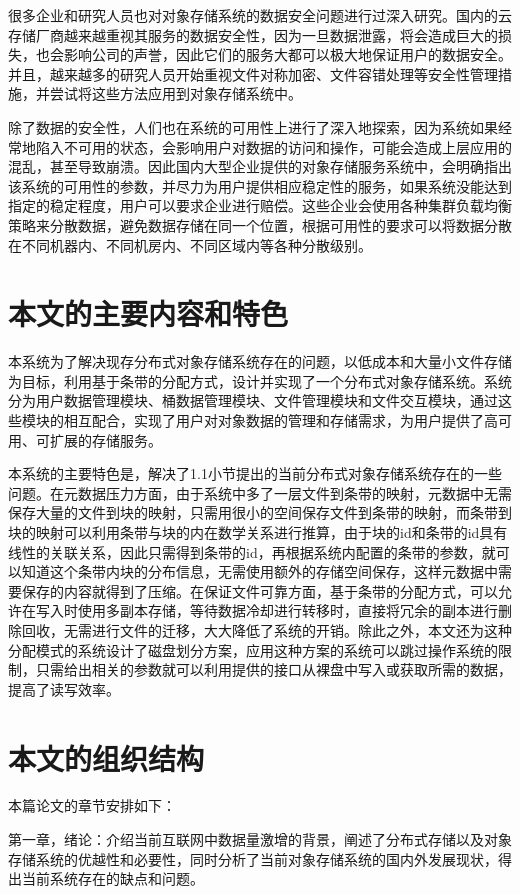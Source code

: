 很多企业和研究人员也对对象存储系统的数据安全问题进行过深入研究。国内的云存储厂商越来越重视其服务的数据安全性，因为一旦数据泄露，将会造成巨大的损失，也会影响公司的声誉，因此它们的服务大都可以极大地保证用户的数据安全。并且，越来越多的研究人员开始重视文件对称加密\cite{19}、文件容错处理等安全性管理措施，并尝试将这些方法应用到对象存储系统中。

除了数据的安全性，人们也在系统的可用性上进行了深入地探索，因为系统如果经常地陷入不可用的状态，会影响用户对数据的访问和操作，可能会造成上层应用的混乱，甚至导致崩溃。因此国内大型企业提供的对象存储服务系统中，会明确指出该系统的可用性的参数，并尽力为用户提供相应稳定性的服务，如果系统没能达到指定的稳定程度，用户可以要求企业进行赔偿。这些企业会使用各种集群负载均衡策略来分散数据，避免数据存储在同一个位置，根据可用性的要求可以将数据分散在不同机器内、不同机房内、不同区域内等各种分散级别。

\section{本文的主要内容和特色}%
本系统为了解决现存分布式对象存储系统存在的问题，以低成本和大量小文件存储为目标，利用基于条带的分配方式，设计并实现了一个分布式对象存储系统。系统分为用户数据管理模块、桶数据管理模块、文件管理模块和文件交互模块，通过这些模块的相互配合，实现了用户对对象数据的管理和存储需求，为用户提供了高可用、可扩展的存储服务。

本系统的主要特色是，解决了1.1小节提出的当前分布式对象存储系统存在的一些问题。在元数据压力方面，由于系统中多了一层文件到条带的映射，元数据中无需保存大量的文件到块的映射，只需用很小的空间保存文件到条带的映射，而条带到块的映射可以利用条带与块的内在数学关系进行推算，由于块的id和条带的id具有线性的关联关系，因此只需得到条带的id，再根据系统内配置的条带的参数，就可以知道这个条带内块的分布信息，无需使用额外的存储空间保存，这样元数据中需要保存的内容就得到了压缩。在保证文件可靠方面，基于条带的分配方式，可以允许在写入时使用多副本存储，等待数据冷却进行转移时，直接将冗余的副本进行删除回收，无需进行文件的迁移，大大降低了系统的开销。除此之外，本文还为这种分配模式的系统设计了磁盘划分方案，应用这种方案的系统可以跳过操作系统的限制，只需给出相关的参数就可以利用提供的接口从裸盘中写入或获取所需的数据，提高了读写效率。

\section{本文的组织结构}%
本篇论文的章节安排如下：

第一章，绪论：介绍当前互联网中数据量激增的背景，阐述了分布式存储以及对象存储系统的优越性和必要性，同时分析了当前对象存储系统的国内外发展现状，得出当前系统存在的缺点和问题。

